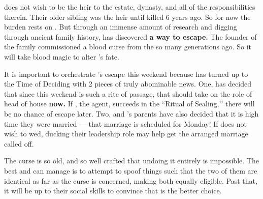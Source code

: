 \documentclass[green]{GL2020}
\begin{document}
\name{\gFaledonHeir{}}

\cHeir{\full} does not wish to be the heir to the \cFaledonParent{\formal} estate, dynasty, and all of the responsibilities therein. Their older sibling \cHeirSibling{\full} was the heir until \cHeirSibling{\they} \cHeirSibling{\were} killed 6 years ago. So for now the burden rests on \cHeir{}. But through an immense amount of research and digging through ancient family history, \cHeir{} has discovered \textbf{a way to escape.} The founder of the \cFaledonParent{\formal} family commissioned a blood curse from the \pFarm{} so many generations ago. So it will take blood magic to alter \cHeir{}’s fate. 

It is important to orchestrate \cHeir{}’s escape this weekend because \cDiplomat{\full} has turned up to the Time of Deciding with 2 pieces of truly abominable news. One, \cFaledonParent{\full} has decided that since this weekend is such a rite of passage, that \cHeir{} should take on the role of head of house \textbf{now.} If \cDiplomat{}, the \cFaledonParent{\formal} agent, succeeds in the ``Ritual of Sealing,’’ there will be no chance of escape later. Two, \cHeir{} and \cChupStudent{\full}’s parents have also decided that it is high time they were married — that marriage is scheduled for Monday! If \cHeir{} does not wish to wed, ducking their leadership role may help get the arranged marriage called off.

The curse is so old, and so well crafted that undoing it entirely is impossible. The best \cHeir{} and \cAmbition{\full} can manage is to attempt to spoof things such that the two of them are identical as far as the curse is concerned, making both equally eligible. Past that, it will be up to their social skills to convince \cDiplomat{} that \cAmbition{} is the better choice.
\end{document}
